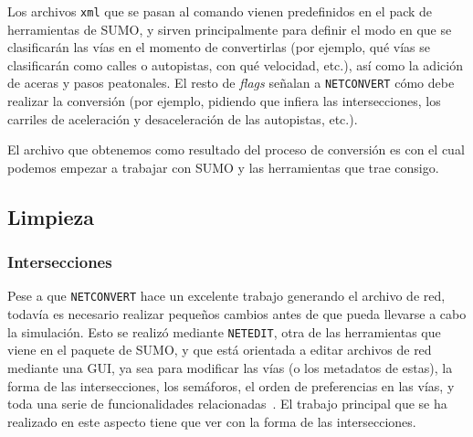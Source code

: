 

Los archivos \texttt{xml} que se pasan al comando vienen predefinidos en el pack de herramientas de SUMO, y sirven principalmente para definir el modo en que se clasificarán las vías en el momento de convertirlas (por ejemplo, qué vías se clasificarán como calles o autopistas, con qué velocidad, etc.), así como la adición de aceras y pasos peatonales. El resto de \textit{flags} señalan a \texttt{NETCONVERT} cómo debe realizar la conversión (por ejemplo, pidiendo que infiera las intersecciones, los carriles de aceleración y desaceleración de las autopistas, etc.).

El archivo que obtenemos como resultado del proceso de conversión es con el cual podemos empezar a trabajar con SUMO y las herramientas que trae consigo.

\subsection{Limpieza}

\subsubsection{Intersecciones}

Pese a que \texttt{NETCONVERT} hace un excelente trabajo generando el archivo de red, todavía es necesario realizar pequeños cambios antes de que pueda llevarse a cabo la simulación. Esto se realizó mediante \texttt{NETEDIT}, otra de las herramientas que viene en el paquete de SUMO, y que está orientada a editar archivos de red mediante una GUI, ya sea para modificar las vías (o los metadatos de estas), la forma de las intersecciones, los semáforos, el orden de preferencias en las vías, y toda una serie de funcionalidades relacionadas~\cite{noauthor_netedit_nodate}. El trabajo principal que se ha realizado en este aspecto tiene que ver con la forma de las intersecciones. 

